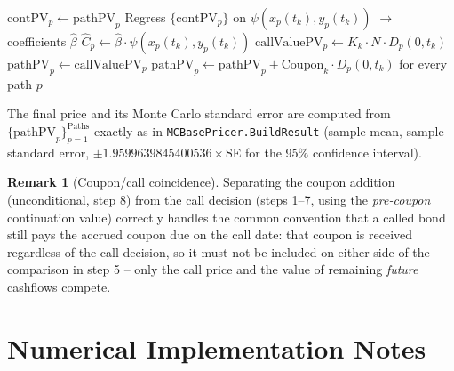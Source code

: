 \documentclass[11pt,a4paper]{article}
\newcommand{\coderef}[1]{\texttt{\color{blue!60!black}#1}}
\theoremstyle{definition}
\newtheorem{remark}{Remark}[section]
\begin{document}
\begin{algorithm}[H]
\caption{Backward induction at event $k$ (per path $p$), as implemented in \coderef{CallableBondMCPricer.Price}}
\begin{algorithmic}[1]
  \State $\text{contPV}_p \gets \text{pathPV}_p$ 
  \State Regress $\{\text{contPV}_p\}$ on $\psi(x_p(t_k),y_p(t_k))$ $\to$ coefficients $\hat\beta$
    \State $\hat{C}_p \gets \hat\beta\cdot\psi(x_p(t_k),y_p(t_k))$
    \State $\text{callValuePV}_p \gets K_k\cdot N \cdot D_p(0,t_k)$
      \State $\text{pathPV}_p \gets \text{callValuePV}_p$ 
    \EndIf
  \EndFor
\EndIf
\State $\text{pathPV}_p \gets \text{pathPV}_p + \text{Coupon}_k\cdot D_p(0,t_k)$ for every path $p$
\end{algorithmic}
\end{algorithm}

The final price and its Monte Carlo standard error are computed from
$\{\text{pathPV}_p\}_{p=1}^{\text{Paths}}$ exactly as in
\coderef{MCBasePricer.BuildResult} (sample mean, sample standard error,
$\pm1.9599639845400536\times$SE for the 95\% confidence interval).

\begin{remark}[Coupon/call coincidence]
Separating the coupon addition (unconditional, step 8) from the call
decision (steps 1--7, using the \emph{pre-coupon} continuation value)
correctly handles the common convention that a called bond still pays the
accrued coupon due on the call date: that coupon is received regardless of
the call decision, so it must not be included on either side of the
comparison in step 5 -- only the call price and the value of remaining
\emph{future} cashflows compete.
\end{remark}

\section{Numerical Implementation Notes}
\label{sec:implementation}
\end{document}
